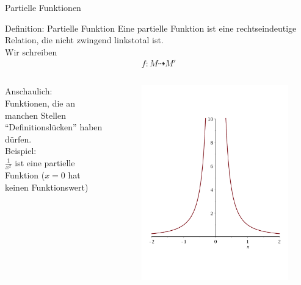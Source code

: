 \begin{frame}{Partielle Funktionen}
    \begin{block}{Definition: Partielle Funktion}
        Eine partielle Funktion ist eine rechtseindeutige Relation, die nicht zwingend linkstotal ist.\\
        Wir schreiben
        \begin{align*}
            f: M\dashrightarrow M'
        \end{align*}
    \end{block}
    \begin{columns}[t]
        \begin{column}{.5\textwidth}
            Anschaulich:\\
            Funktionen, die an manchen Stellen ``Definitionslücken'' haben dürfen.\\
            Beispiel:\\
            $\frac{1}{x^2}$ ist eine partielle Funktion ($x=0$ hat keinen Funktionswert)
        \end{column}
        \begin{column}{.5\textwidth}
            \begin{figure}[t]
                \includegraphics[scale=0.15]{graphics/12/partielle_funktion}
            \end{figure}
        \end{column}
    \end{columns}
\end{frame}
